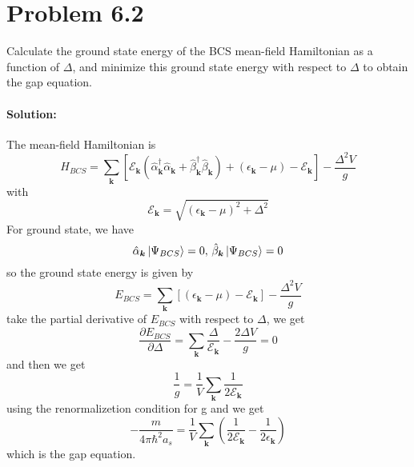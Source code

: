 \section*{Problem 6.2}
Calculate the ground state energy of the BCS mean-field Hamiltonian as a function of $\Delta $, and minimize this ground state energy with respect to $\Delta $ to obtain the gap equation.
\paragraph*{Solution:}
The mean-field Hamiltonian is 
\begin{equation}
    H_{BCS} 
    = \sum_{\bm{k}} \left[\mathcal{E}_{\bm{k}} 
    \left( \hat{\alpha}^{\dagger}_{\bm{k}} \hat{\alpha}_{\bm{k}} 
    + \hat{\beta}^{\dagger}_{\bm{k}}\hat{\beta}_{\bm{k}}\right) 
    + \left( \epsilon_{\bm{k}} - \mu\right)
    - \mathcal{E}_{\bm{k}} \right]
    - \frac{\Delta^2 V}{g}
\end{equation}
with 
\begin{equation}
    \mathcal{E}_{\bm{k}} = \sqrt{(\epsilon_{\bm{k}}-\mu)^2 + \Delta^2}
\end{equation}
For ground state, we have
\begin{equation}
    \hat{\alpha}_{\bm{k}} \ket{\Psi_{BCS}} = 0, \, 
    \hat{\beta}_{\bm{k}} \ket{\Psi_{BCS}} = 0
\end{equation}
so the ground state energy is given by 
\begin{equation}
    E_{BCS} = \sum_{\bm{k}} \left[
        (\epsilon_{\bm{k}} - \mu) - \mathcal{E}_{\bm{k}}
    \right] 
    - \frac{\Delta^2 V}{g}
\end{equation}
take the partial derivative of $E_{BCS}$ with respect to $\Delta$, we get 
\begin{equation}
    \frac{\partial E_{BCS}}{\partial \Delta}
    = \sum_{\bm{k}} \frac{\Delta}{\mathcal{E}_{\bm{k}}} - \frac{2\Delta V}{g} = 0
\end{equation}
and then we get
\begin{equation}
    \frac{1}{g} 
    = \frac{1}{V} \sum_{\bm{k}} \frac{1}{2 \mathcal{E}_{\bm{k}}}
\end{equation}
using the renormalizetion condition for g and we get 
\begin{equation}
    -\frac{m}{4\pi \hbar^2 a_s}
    = \frac{1}{V} \sum_{\bm{k}} \left(
        \frac{1}{2 \mathcal{E}_{\bm{k}}} 
        - \frac{1}{2 \epsilon_{\bm{k}}}
    \right)
\end{equation}
which is the gap equation. 